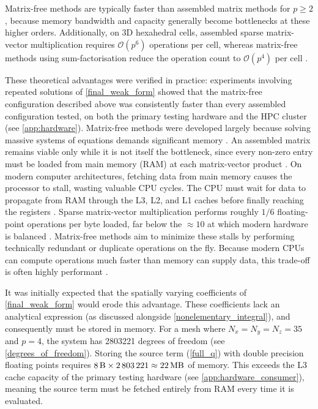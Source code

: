 \documentclass{article}
\begin{document}
Matrix-free methods are typically faster than assembled matrix methods for $p \geq 2$ \cite{Kronbichler2022}, because memory bandwidth and capacity generally become bottlenecks at these higher orders. %
Additionally, on 3D hexahedral cells, assembled sparse matrix-vector multiplication requires $\mathcal{O}(p^6)$ operations per cell, whereas matrix-free methods using sum-factorisation reduce the operation count to $\mathcal{O}(p^4)$ per cell \cite{Homolya2017, KirbyMitchell2018}.

These theoretical advantages were verified in practice: experiments involving repeated solutions of \cref{final_weak_form} showed that the matrix-free configuration described above was consistently faster than every assembled configuration tested, on both the primary testing hardware and the HPC cluster (see \cref{app:hardware}).
Matrix-free methods were developed largely because solving massive systems of equations demands significant memory \cite{Muench2024}.
An assembled matrix remains viable only while it is not itself the bottleneck, since every non-zero entry must be loaded from main memory (RAM) at each matrix-vector product \cite{Muench2024}.
On modern computer architectures, fetching data from main memory causes the processor to stall, wasting valuable CPU cycles.
The CPU must wait for data to propagate from RAM through the L3, L2, and L1 caches before finally reaching the registers \cite{hennessy2017computer}.
Sparse matrix-vector multiplication performs roughly $1/6$ floating-point operations per byte loaded, far below the $\approx 10$ at which modern hardware is balanced \cite{KirbyMitchell2018}.
Matrix-free methods aim to minimize these stalls by performing technically redundant or duplicate operations on the fly.
Because modern CPUs can compute operations much faster than memory can supply data, this trade-off is often highly performant \cite{Muench2024}.

It was initially expected that the spatially varying coefficients of \cref{final_weak_form} would erode this advantage.
These coefficients lack an analytical expression (as discussed alongside \cref{nonelementary_integral}), and consequently must be stored in memory.
For a mesh where $N_x=N_y=N_z=35$ and $p=4$, the system has \num{2803221} degrees of freedom (see \cref{degrees_of_freedom}).
Storing the source term (\cref{full_q}) with double precision floating points requires $\qty{8}{\byte} \times \num{2803221} \approx \qty{22}{\mega\byte}$ of memory.
This exceeds the L3 cache capacity of the primary testing hardware (see \cref{app:hardware_consumer}), meaning the source term must be fetched entirely from RAM every time it is evaluated.
\end{document}
